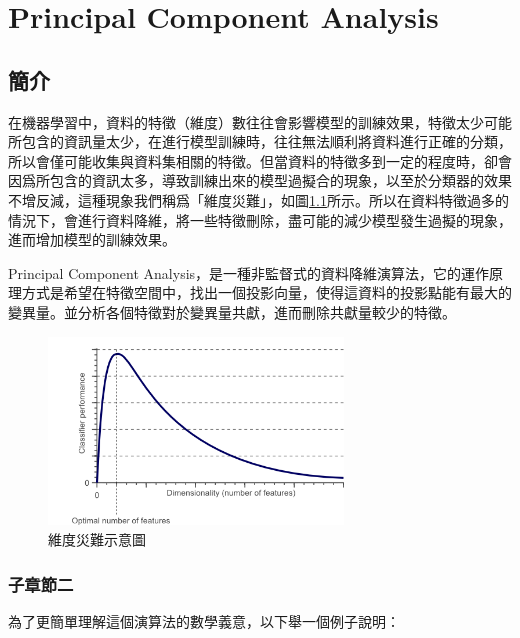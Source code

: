 \chapter{Principal Component Analysis}
\label{chapter:pca}
\section{簡介}
\label{sec:background}


在機器學習中，資料的特徵（維度）數往往會影響模型的訓練效果，特徵太少可能所包含的資訊量太少，在進行模型訓練時，往往無法順利將資料進行正確的分類，所以會僅可能收集與資料集相關的特徵。但當資料的特徵多到一定的程度時，卻會因爲所包含的資訊太多，導致訓練出來的模型過擬合的現象，以至於分類器的效果不增反減，這種現象我們稱爲「維度災難」，如圖\ref{fig:curse_of_dimesionality}所示。所以在資料特徵過多的情況下，會進行資料降維，將一些特徵刪除，盡可能的減少模型發生過擬的現象，進而增加模型的訓練效果。

Principal Component Analysis，是一種非監督式的資料降維演算法，它的運作原理方式是希望在特徵空間中，找出一個投影向量，使得這資料的投影點能有最大的變異量。並分析各個特徵對於變異量共獻，進而刪除共獻量較少的特徵。



\begin{figure}[h]
	\centering
	\includegraphics[height=5cm]{./pic/NZgacRXF.png}
	\caption{維度災難示意圖}
	\label{fig:curse_of_dimesionality}
\end{figure}


\subsection{子章節二}
為了更簡單理解這個演算法的數學義意，以下舉一個例子說明：

